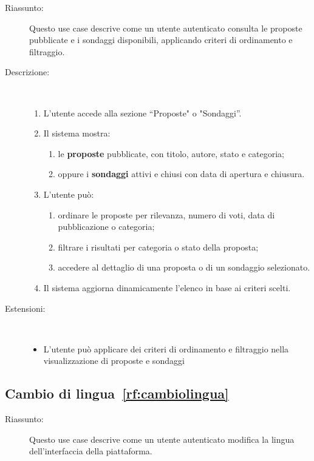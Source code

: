 \begin{ucscope}
\begin{description}
	\item[Riassunto:]
	Questo use case descrive come un utente autenticato consulta le proposte pubblicate e i sondaggi disponibili, applicando criteri di ordinamento e filtraggio.
	
	\item[Descrizione:]~
	\begin{enumerate}
		\item L’utente accede alla sezione ``Proposte" o "Sondaggi''.
		\item Il sistema mostra:
		\begin{enumerate}
			\item le \textbf{proposte} pubblicate, con titolo, autore, stato e categoria;
			\item oppure i \textbf{sondaggi} attivi e chiusi con data di apertura e chiusura.
		\end{enumerate}
		\item L’utente può:
		\begin{enumerate}
			\item ordinare le proposte per rilevanza, numero di voti, data di pubblicazione o categoria;
			\item filtrare i risultati per categoria o stato della proposta;
			\item accedere al dettaglio di una proposta o di un sondaggio selezionato.
		\end{enumerate}
		\item Il sistema aggiorna dinamicamente l’elenco in base ai criteri scelti.
	\end{enumerate}

	\item[Estensioni:]~
	\begin{itemize}
		\item[(0)] L'utente può applicare dei criteri di ordinamento e filtraggio nella visualizzazione di proposte e sondaggi
	\end{itemize}
\end{description}

\subsection{Cambio di lingua~\ref{rf:cambiolingua}}

\begin{description}
	\item[Riassunto:]
	Questo use case descrive come un utente autenticato modifica la lingua dell’interfaccia della piattaforma.


\end{description}
\end{ucscope}
